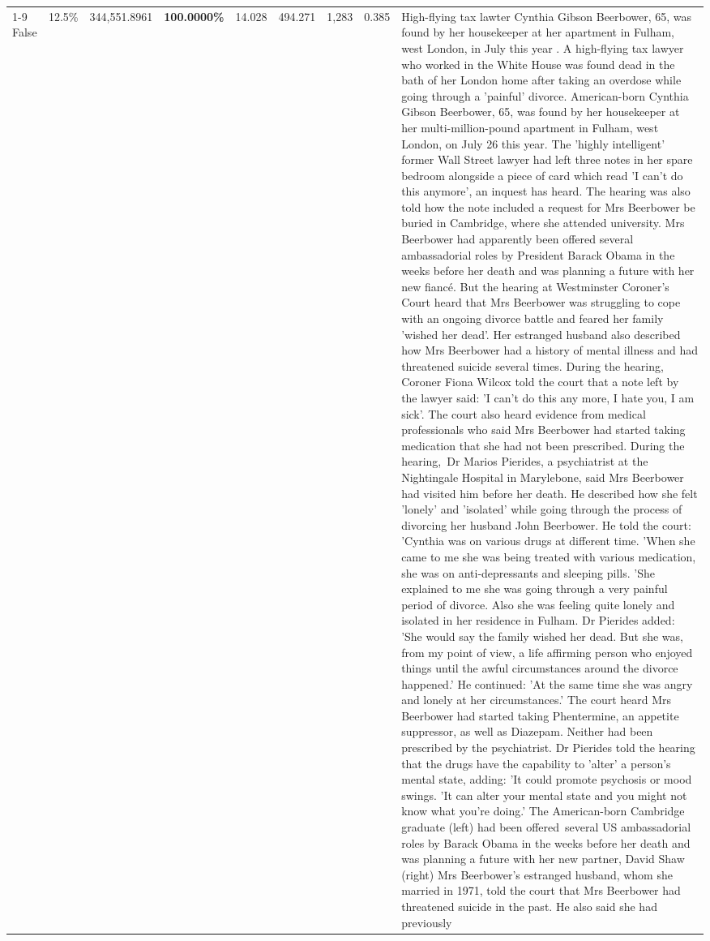\begin{table}[H]
\begin{tabular}{lllrlllll}
\cline{1-9}
False & 12.5\% & 344,551.8961 & \bfseries \color{red} 100.0000\% & 14.028 & 494.271 & 1,283 & 0.385 & High-flying tax lawter Cynthia Gibson Beerbower, 65, was found by her housekeeper at her apartment in Fulham, west London, in July this year . A high-flying tax lawyer who worked in the White House was found dead in the bath of her London home after taking an overdose while going through a 'painful' divorce. American-born Cynthia Gibson Beerbower, 65, was found by her housekeeper at her multi-million-pound apartment in Fulham, west London, on July 26 this year. The 'highly intelligent' former Wall Street lawyer had left three notes in her spare bedroom alongside a piece of card which read 'I can't do this anymore', an inquest has heard. The hearing was also told how the note included a request for Mrs Beerbower be buried in Cambridge, where she attended university. Mrs Beerbower had apparently been offered several ambassadorial roles by President Barack Obama in the weeks before her death and was planning a future with her new fiancé. But the hearing at Westminster Coroner's Court heard that Mrs Beerbower was struggling to cope with an ongoing divorce battle and feared her family 'wished her dead'. Her estranged husband also described how Mrs Beerbower had a history of mental illness and had threatened suicide several times. During the hearing, Coroner Fiona Wilcox told the court that a note left by the lawyer said: 'I can't do this any more, I hate you, I am sick'. The court also heard evidence from medical professionals who said Mrs Beerbower had started taking medication that she had not been prescribed. During the hearing, Dr Marios Pierides, a psychiatrist at the Nightingale Hospital in Marylebone, said Mrs Beerbower had visited him before her death. He described how she felt 'lonely' and 'isolated' while going through the process of divorcing her husband John Beerbower. He told the court: 'Cynthia was on various drugs at different time. 'When she came to me she was being treated with various medication, she was on anti-depressants and sleeping pills. 'She explained to me she was going through a very painful period of divorce. Also she was feeling quite lonely and isolated in her residence in Fulham. Dr Pierides added: 'She would say the family wished her dead. But she was, from my point of view, a life affirming person who enjoyed things until the awful circumstances around the divorce happened.' He continued: 'At the same time she was angry and lonely at her circumstances.' The court heard Mrs Beerbower had started taking Phentermine, an appetite suppressor, as well as Diazepam. Neither had been prescribed by the psychiatrist. Dr Pierides told the hearing that the drugs have the capability to 'alter' a person's mental state, adding: 'It could promote psychosis or mood swings. 'It can alter your mental state and you might not know what you're doing.' The American-born Cambridge graduate (left) had been offered several US ambassadorial roles by Barack Obama in the weeks before her death and was planning a future with her new partner, David Shaw (right) Mrs Beerbower's estranged husband, whom she married in 1971, told the court that Mrs Beerbower had threatened suicide in the past. He also said she had previously 
\end{tabular}
\end{table}
